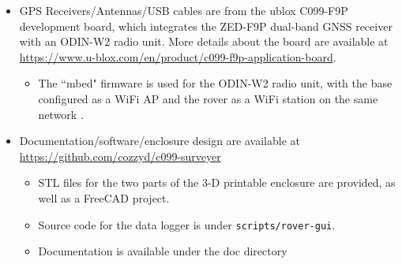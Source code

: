 \documentclass[usletter]{article}
\begin{document}
\begin{itemize} 

\item GPS Receivers/Antennas/USB cables are from the ublox C099-F9P development board, which integrates the ZED-F9P dual-band GNSS receiver with an ODIN-W2 radio unit. More details about the board are available at \url{https://www.u-blox.com/en/product/c099-f9p-application-board}. 
\begin{itemize} 
\item The ``mbed" firmware is used for the ODIN-W2 radio unit, with the base configured as a WiFi AP and the rover as a WiFi station on the same network .

\end{itemize} 
\item Documentation/software/enclosure design are available at \url{https://github.com/cozzyd/c099-surveyer} 
\begin{itemize} 
\item STL files for the two parts of the 3-D printable enclosure are provided, as well as a FreeCAD project. 
\item Source code for the data logger is under \texttt{scripts/rover-gui}. 
\item Documentation is available under the doc directory 
\end{itemize} 
\end{itemize} 
\end{document}
